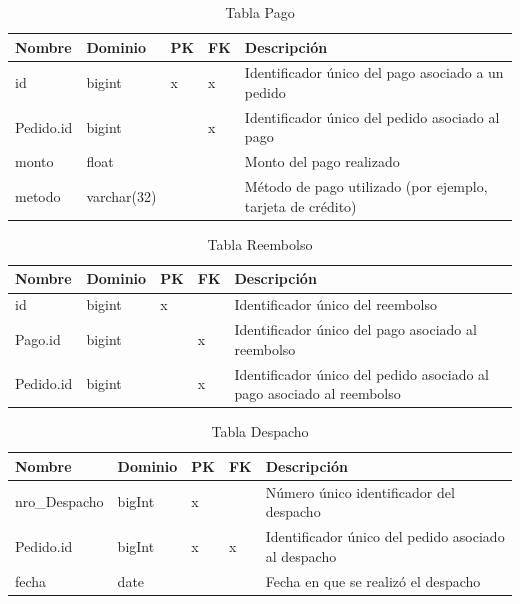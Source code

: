 \documentclass[10pt, a4paper,openany]{report}
\begin{document}
\begin{table}[h]
	\centering
	\begin{tabular}{|l|p{1.5cm}|p{0.5cm}|p{0.5cm}|p{3cm}|}
		\hline
		\textbf{Nombre} & \textbf{Dominio} & \textbf{PK} & \textbf{FK} & \textbf{Descripción}                                       \\
		\hline
		id              & bigint           & x           & x           & Identificador único del pago asociado a un pedido          \\
		\hline
		Pedido.id       & bigint           &             & x           & Identificador único del pedido asociado al pago            \\
		\hline
		monto           & float            &             &             & Monto del pago realizado                                   \\
		\hline
		metodo          & varchar(32)      &             &             & Método de pago utilizado (por ejemplo, tarjeta de crédito) \\
		\hline
	\end{tabular}
	\caption{Tabla Pago}
\end{table}

\begin{table}[h]
	\centering
	\begin{tabular}{|l|p{1.5cm}|p{0.5cm}|p{0.5cm}|p{3cm}|}
		\hline
		\textbf{Nombre} & \textbf{Dominio} & \textbf{PK} & \textbf{FK} & \textbf{Descripción}                                                  \\
		\hline
		id              & bigint           & x           &             & Identificador único del reembolso                                     \\
		\hline
		Pago.id         & bigint           &             & x           & Identificador único del pago asociado al reembolso                    \\
		\hline
		Pedido.id       & bigint           &             & x           & Identificador único del pedido asociado al pago asociado al reembolso \\
		\hline
	\end{tabular}
	\caption{Tabla Reembolso}
\end{table}

\begin{table}[h]
	\centering
	\begin{tabular}{|l|p{1.5cm}|p{0.5cm}|p{0.5cm}|p{3cm}|}
		\hline
		\textbf{Nombre} & \textbf{Dominio} & \textbf{PK} & \textbf{FK} & \textbf{Descripción}                                \\
		\hline
		nro\_Despacho   & bigInt           & x         &  & Número único identificador del despacho             \\
		\hline
		Pedido.id       & bigInt           &     x       & x& Identificador único del pedido asociado al despacho \\
		\hline
		fecha           & date             &           &  & Fecha en que se realizó el despacho                 \\
		\hline
	\end{tabular}
	\caption{Tabla Despacho}
\end{table}
\end{document}
